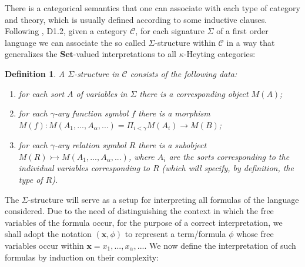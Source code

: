 \documentclass[a4paper,11pt]{article}
\theoremstyle{plain}
\theoremstyle{plain}
\newtheorem{defs}[thm]{Definition}
\theoremstyle{remark}
\newcommand{\Sets}{\ensuremath{\mathbf{Set}}}
\begin{document}
There is a categorical semantics that one can associate with each type of category and theory, which is usually defined according to some inductive clauses. Following \cite{johnstone}, D1.2, given a category $\mathcal{C}$, for each signature $\Sigma$ of a first order language we can associate the so called $\Sigma$-structure within $\mathcal{C}$ in a way that generalizes the $\Sets$-valued interpretations to all $\kappa$-Heyting categories:

\begin{defs}
 A $\Sigma$-structure in $\mathcal{C}$ consists of the following data:
 \begin{enumerate}
  \item for each sort $A$ of variables in $\Sigma$ there is a corresponding object $M(A)$;
  \item for each $\gamma$-ary function symbol $f$ there is a morphism $M(f): M(A_1, ..., A_{\alpha}, ...)=\Pi_{i<\gamma} M(A_i) \rightarrow M(B)$;
  \item for each $\gamma$-ary relation symbol $R$ there is a subobject $M(R) \rightarrowtail M(A_1, ..., A_{\alpha}, ...)$, where $A_i$ are the sorts corresponding to the individual variables corresponding to $R$ (which will specify, by definition, the type of $R$).
 \end{enumerate}

\end{defs}

The $\Sigma$-structure will serve as a setup for interpreting all formulas of the language considered. Due to the need of distinguishing the context in which the free variables of the formula occur, for the purpose of a correct interpretation, we shall adopt the notation $(\mathbf{x}, \phi)$ to represent a term/formula $\phi$ whose free variables occur within $\mathbf{x}=x_1, ...,x_{\alpha}, ...$. We now define the interpretation of such formulas by induction on their complexity:
\end{document}
